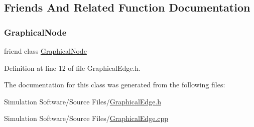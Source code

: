 \subsection{Friends And Related Function Documentation}
\mbox{\label{class_graphical_edge_adc7790177f80355fce81568dcdbf561e}} 
\subsubsection{\texorpdfstring{Graphical\+Node}{GraphicalNode}}
{\footnotesize\ttfamily friend class \hyperlink{class_graphical_node}{Graphical\+Node}\hspace{0.3cm}{\ttfamily [friend]}}



Definition at line 12 of file Graphical\+Edge.\+h.



The documentation for this class was generated from the following files\+:\begin{DoxyCompactItemize}
\item 
Simulation Software/\+Source Files/\hyperlink{_graphical_edge_8h}{Graphical\+Edge.\+h}\item 
Simulation Software/\+Source Files/\hyperlink{_graphical_edge_8cpp}{Graphical\+Edge.\+cpp}\end{DoxyCompactItemize}
